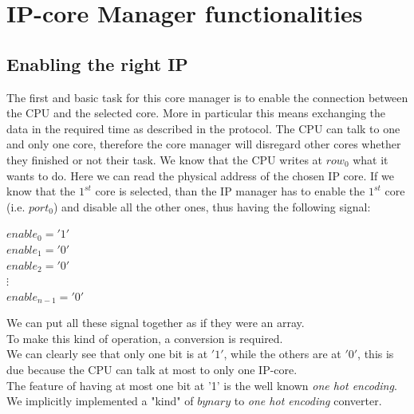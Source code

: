 \chapter{IP-core Manager functionalities}
\label{chap1}
\section{Enabling the right IP}
The first and basic task for this core manager is to enable the connection between the CPU and the selected core. More in particular this means exchanging the data in the required time as described in the protocol. The CPU can talk to one and only one core, therefore the core manager will disregard other cores whether they finished or not their task.
We know that the CPU writes at $ row_{0} $ what it wants to do. Here we can read the physical address of the chosen IP core.
If we know that the $ 1^{st} $ core is selected, than the IP manager has to enable the $ 1^{st} $ core (i.e. $port_{0}  $) and disable all the other ones, thus having the following signal:\\
\begin{center}
	$ enable_0='1' $\\
$ enable_1='0' $\\
$ enable_2='0' $\\
$  \vdots $\\
$ enable_{n-1}='0' $
\end{center}
\bigskip
We can put all these signal together as if they were an array.\\
\bigskip
To make this kind of operation, a conversion is required.\\
We can clearly see that only one bit is at $ '1' $, while the others are at $ '0' $, this is due because the CPU can talk at most to only one IP-core.\\
The feature of having at most one bit at '1' is the well known \textit{one hot encoding}.\\
We implicitly implemented a "kind" of $ bynary $ to \textit{one hot encoding} converter.

